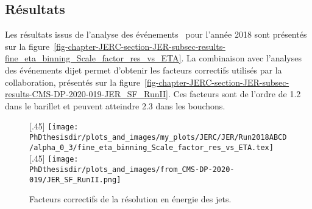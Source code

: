 \subsection{Résultats}\label{chapter-JERC-section-JER-subsec-results}
Les résultats issus de l'analyse des événements \Gjets\ pour l'année 2018 sont présentés sur la figure~\ref{fig-chapter-JERC-section-JER-subsec-results-fine_eta_binning_Scale_factor_res_vs_ETA}.
La combinaison avec l'analyses des événements dijet permet d'obtenir les facteurs correctifs utilisés par la collaboration, présentés sur la figure~\ref{fig-chapter-JERC-section-JER-subsec-results-CMS-DP-2020-019-JER_SF_RunII}.
Ces facteurs sont de l'ordre de \num{1.2} dans le barillet et peuvent atteindre \num{2.3} dans les bouchons.
\begin{figure}[h]
\centering
{}[.45\textwidth]
{\texttt{[image: \\PhDthesisdir/plots\_and\_images/my\_plots/JERC/JER/Run2018ABCD/alpha\_0\_3/fine\_eta\_binning\_Scale\_factor\_res\_vs\_ETA.tex]}}
\hfill
{}[.45\textwidth]
{\texttt{[image: \\PhDthesisdir/plots\_and\_images/from\_CMS-DP-2020-019/JER\_SF\_RunII.png]}}

\caption{Facteurs correctifs de la résolution en énergie des jets.}
\end{figure}